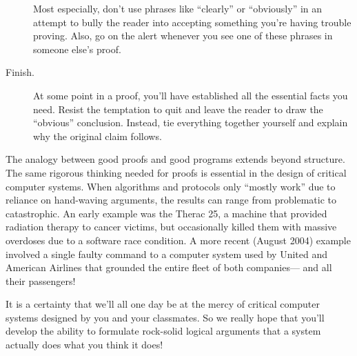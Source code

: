 \begin{description}
  Most especially, don't use phrases like ``clearly'' or ``obviously'' in
  an attempt to bully the reader into accepting something you're having
  trouble proving.  Also, go on the alert whenever you see one of these
  phrases in someone else's proof.

\item[Finish.]  At some point in a proof, you'll have established all the
essential facts you need.  Resist the temptation to quit and leave the
reader to draw the ``obvious'' conclusion.  Instead, tie everything
together yourself and explain why the original claim follows.

\end{description}

The analogy between good proofs and good programs extends beyond
structure.  The same rigorous thinking needed for proofs is essential in
the design of critical computer systems.  When algorithms and protocols
only ``mostly work'' due to reliance on hand-waving arguments, the results
can range from problematic to catastrophic.  An early example was the
Therac 25, a machine that provided radiation therapy to cancer victims,
but occasionally killed them with massive overdoses due to a software race
condition.  A more recent (August 2004) example involved a single faulty
command to a computer system used by United and American Airlines that
grounded the entire fleet of both companies--- and all their passengers!

It is a certainty that we'll all one day be at the mercy of critical
computer systems designed by you and your classmates.  So we really
hope that you'll develop the ability to formulate rock-solid logical
arguments that a system actually does what you think it does!


\begin{problems}
\classproblems
{}

\homeworkproblems
{}
\end{problems}

\endinput

